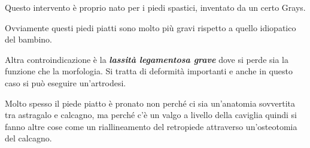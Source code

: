 Questo intervento è proprio nato per i piedi spastici, inventato da un certo Grays.

Ovviamente questi piedi piatti sono molto più gravi rispetto a quello idiopatico del bambino.

Altra controindicazione è la \textbf{\emph{lassità legamentosa grave}} dove si perde sia la funzione che la morfologia. Si tratta di deformità importanti e anche in questo caso si può eseguire un'artrodesi.

Molto spesso il piede piatto è pronato non perché ci sia un'anatomia sovvertita tra astragalo e calcagno, ma perché c'è un valgo a livello della caviglia quindi si fanno altre cose come un riallineamento del retropiede attraverso un'osteotomia del calcagno.
